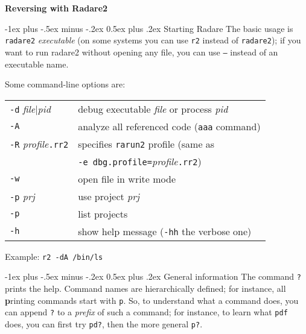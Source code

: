 \documentclass[a4paper,landscape]{article}
\makeatletter
\renewcommand{\section}{\@startsection{section}{1}{0mm}%
                                {-1ex plus -.5ex minus -.2ex}%
                                {0.5ex plus .2ex}%
                                {\normalfont\large\bfseries}}
\makeatother
\begin{document}
\footnotesize
\begin{multicols*}{3}
\setlength{\premulticols}{1pt}
\setlength{\postmulticols}{1pt}
\setlength{\multicolsep}{1pt}
\setlength{\columnsep}{2pt}

\begin{center}
     \Large{\textbf{Reversing with Radare2}} \\
\end{center}

\section{Starting Radare}
The basic usage is \texttt{radare2} \textit{executable} (on some systems you can
use \texttt{r2} instead of \texttt{radare2}); if you want to run radare2 without
opening any file, you can use \texttt{--} instead of an executable name.

Some command-line options are:

\begin{tabular}{@{}ll@{}}
\texttt{-d} \textit{file}$|$\textit{pid} & debug executable \textit{file} or process \textit{pid} \\
\texttt{-A}	& analyze all referenced code (\texttt{aaa} command) \\
\texttt{-R} \textit{profile}\texttt{.rr2} & specifies \texttt{rarun2} profile (same as \\ & \texttt{-e dbg.profile=}\textit{profile}\texttt{.rr2}) \\
\texttt{-w}	& open file in write mode \\
\texttt{-p} \textit{prj} & use project \textit{prj} \\
\texttt{-p} & list projects \\
\texttt{-h} & show help message (\texttt{-hh} the verbose one)
\end{tabular}

Example: \texttt{r2 -dA /bin/ls}

\section{General information}
The command \texttt{?} prints the help. Command names are hierarchically defined; for instance, all \textbf{p}rinting commands start with \texttt{p}. So, to understand what a command does, you can append \texttt{?} to a \emph{prefix} of such a command; for instance, to learn what \texttt{pdf} does, you can first try \texttt{pd?}, then the more general \texttt{p?}.


\end{multicols*}
\end{document}
